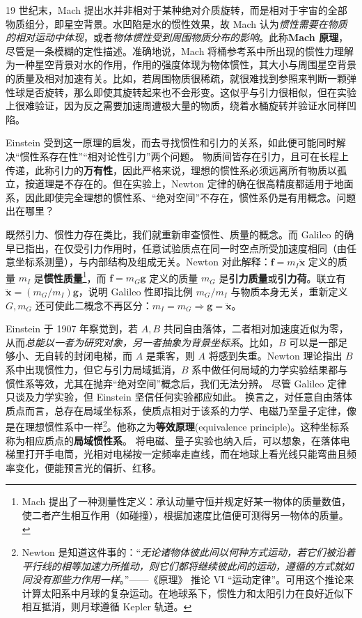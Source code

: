 19 世纪末，Mach 提出水并非相对于某种绝对介质旋转，而是相对于宇宙的全部物质组分，即星空背景。水凹陷是水的惯性效果，故 Mach 认为\textit{惯性需要在物质的相对运动中体现}，或者\textit{物体惯性受到周围物质分布的影响}。此称\textbf{Mach 原理}，尽管是一条模糊的定性描述。准确地说，Mach 将桶参考系中所出现的惯性力理解为一种星空背景对水的作用，作用的强度体现为物体惯性，其大小与周围星空背景的质量及相对加速有关。比如，若周围物质很稀疏，就很难找到参照来判断一颗弹性球是否旋转，那么即使其旋转起来也不会形变。这似乎与引力很相似，但在实验上很难验证，因为反之需要加速周遭极大量的物质，绕着水桶旋转并验证水同样凹陷。

Einstein 受到这一原理的启发，而去寻找惯性和引力的关系，如此便可能同时解决“惯性系存在性”“相对论性引力”两个问题。
物质间皆存在引力，且可在长程上传递，此称引力的\textbf{万有性}，因此严格来说，理想的惯性系必须远离所有物质以孤立，按道理是不存在的。但在实验上，Newton 定律的确在很高精度都适用于地面系，因此即使完全理想的惯性系、“绝对空间”不存在，惯性系仍是有用概念。问题出在哪里？

既然引力、惯性力存在类比，我们就重新审查惯性、质量的概念。而 Galileo 的确早已指出，在仅受引力作用时，任意试验质点在同一时空点所受加速度相同（由任意坐标系测量），与内部结构及组成无关。Newton 对此解释：$\bm f=m_I\ddot{\bm x}$ 定义的质量 $m_I$ 是\textbf{惯性质量}\footnote{Mach 提出了一种测量性定义：承认动量守恒并规定好某一物体的质量数值，使二者产生相互作用（如碰撞），根据加速度比值便可测得另一物体的质量。}，而 $\bm f=m_G\bm g $ 定义的质量 $m_G$ 是\textbf{引力质量}或\textbf{引力荷}。联立有 $\ddot{\bm x}=(m_G/m_I)\bm g $，说明 Galileo 性即指比例 $m_G/m_I$ 与物质本身无关，重新定义 $G,m_G$ 还可使此二概念不再区分：$m_I=m_G\Rightarrow\bm g =\ddot{\bm x}$。

Einstein 于 1907 年察觉到，若 $A,B$ 共同自由落体，二者相对加速度近似为零，从而\textit{总能以一者为研究对象，另一者抽象为背景坐标系}。比如，$B$ 可以是一部足够小、无自转的封闭电梯，而 $A$ 是乘客，则 $A$ 将感到失重。Newton 理论指出 $B$ 系中出现惯性力，但它与引力局域抵消，$B$ 系中做任何局域的力学实验结果都与惯性系等效，尤其在抛弃“绝对空间”概念后，我们无法分辨。
尽管 Galileo 定律只谈及力学实验，但 Einstein 坚信任何实验都应如此。
换言之，对任意自由落体质点而言，总存在局域坐标系，使质点相对于该系的力学、电磁乃至量子定律，像是在理想惯性系中一样\footnote{Newton 是知道这件事的：“\textit{无论诸物体彼此间以何种方式运动，若它们被沿着平行线的相等加速力所推动，则它们都将继续彼此间的运动，遵循的方式就如同没有那些力作用一样}。”——《原理》\cite{Principia} 推论 VI “运动定律”。可用这个推论来计算太阳系中月球的复杂运动。在地球系下，惯性力和太阳引力在良好近似下相互抵消，则月球遵循 Kepler 轨道。}。他称之为\textbf{等效原理}(equivalence principle)。这种坐标系称为相应质点的\textbf{局域惯性系}。
将电磁、量子实验也纳入后，可以想象，在落体电梯里打开手电筒，光相对电梯按一定频率走直线，而在地球上看光线只能弯曲且频率变化，便能预言光的偏折、红移。

